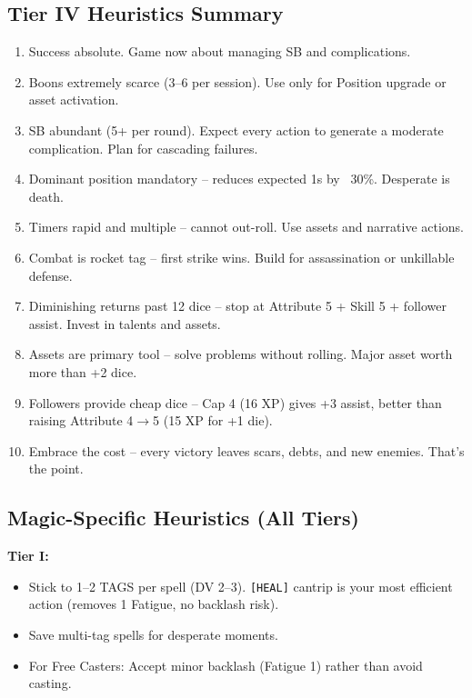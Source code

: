 \documentclass[11pt]{article}
\begin{document}
\subsection{Tier IV Heuristics Summary}
\begin{enumerate}
    \item Success absolute. Game now about managing SB and complications.
    \item Boons extremely scarce (3--6 per session). Use only for Position upgrade or asset activation.
    \item SB abundant (5+ per round). Expect every action to generate a moderate complication. Plan for cascading failures.
    \item Dominant position mandatory -- reduces expected 1s by ~30\%. Desperate is death.
    \item Timers rapid and multiple -- cannot out-roll. Use assets and narrative actions.
    \item Combat is rocket tag -- first strike wins. Build for assassination or unkillable defense.
    \item Diminishing returns past 12 dice -- stop at Attribute 5 + Skill 5 + follower assist. Invest in talents and assets.
    \item Assets are primary tool -- solve problems without rolling. Major asset worth more than +2 dice.
    \item Followers provide cheap dice -- Cap 4 (16 XP) gives +3 assist, better than raising Attribute 4$\rightarrow$5 (15 XP for +1 die).
    \item Embrace the cost -- every victory leaves scars, debts, and new enemies. That's the point.
\end{enumerate}

\subsection*{Magic-Specific Heuristics (All Tiers)}

\textbf{Tier I:}
\begin{itemize}
    \item Stick to 1--2 TAGS per spell (DV 2--3). \texttt{[HEAL]} cantrip is your most efficient action (removes 1 Fatigue, no backlash risk).
    \item Save multi-tag spells for desperate moments.
    \item For Free Casters: Accept minor backlash (Fatigue 1) rather than avoid casting.
\end{itemize}
\end{document}
